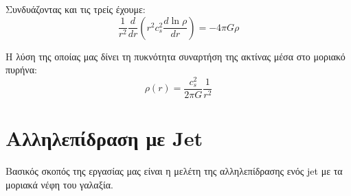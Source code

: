 \documentclass[article,a4paper,11.2pt]{memoir}
\numberwithin{equation}{subsection}
\begin{document}
	Συνδυάζοντας και τις τρείς έχουμε:
	\begin{equation}
	\frac{1}{r^2}\frac{d}{dr} \left( r^2 c_s ^2 \frac{d \ln \rho}{dr}\right)  = -4 \pi G \rho
	\end{equation}
	
	Η λύση της οποίας μας δίνει τη πυκνότητα συναρτήση της ακτίνας μέσα στο μοριακό πυρήνα:
	\begin{equation}
	\label{eq:B-E_density}
	\rho (r) =\frac{c_s ^2}{2 \pi G} \frac{1}{r^2}
	\end{equation}
	
	
	
	\section{Αλληλεπίδραση με Jet}
	Βασικός σκοπός της εργασίας μας είναι η μελέτη της αλληλεπίδρασης ενός jet με τα μοριακά νέφη του γαλαξία.
	
	
	
\end{document}
